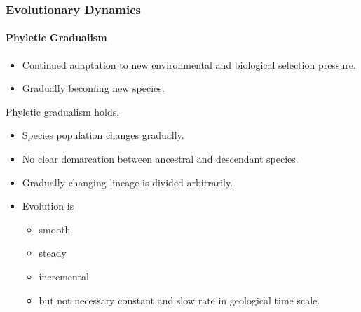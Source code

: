 \frame
{
	\frametitle{Evolutionary Dynamics}
	\framesubtitle{Phyletic Gradualism}

	\begin{itemize}
		\item Continued adaptation to new environmental and biological selection pressure.
		\item Gradually becoming new species.
	\end{itemize}
	
	Phyletic gradualism holds,
	\begin{itemize}
		\item Species population changes gradually.
		\item No clear demarcation between ancestral and descendant species.
		\item Gradually changing lineage is divided arbitrarily.
		\item Evolution is 
			\begin{itemize}
				\item smooth
				\item steady
				\item incremental
				\item but not necessary constant and slow rate in geological time scale.
			\end{itemize}
	\end{itemize}
}

